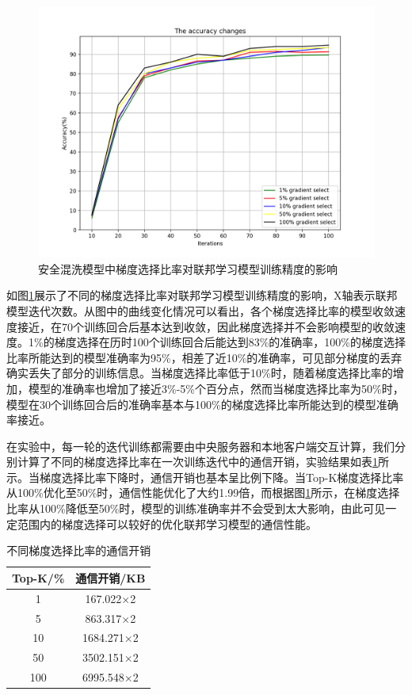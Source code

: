 \begin{figure}[!hbt]
\centering
  	\includegraphics[scale=0.5]{fig2/C4/实验一K值}%
	\caption{安全混洗模型中梯度选择比率对联邦学习模型训练精度的影响}
  	\label{fig:安全混洗模型中梯度选择比率对联邦学习模型训练精度的影响} 
\end{figure}

如图\ref{fig:安全混洗模型中梯度选择比率对联邦学习模型训练精度的影响}展示了不同的梯度选择比率对联邦学习模型训练精度的影响，X轴表示联邦模型迭代次数。从图中的曲线变化情况可以看出，各个梯度选择比率的模型收敛速度接近，在70个训练回合后基本达到收敛，因此梯度选择并不会影响模型的收敛速度。1\%的梯度选择在历时100个训练回合后能达到83\%的准确率，100\%的梯度选择比率所能达到的模型准确率为95\%，相差了近10\%的准确率，可见部分梯度的丢弃确实丢失了部分的训练信息。当梯度选择比率低于10\%时，随着梯度选择比率的增加，模型的准确率也增加了接近3\%-5\%个百分点，然而当梯度选择比率为50\%时，模型在30个训练回合后的准确率基本与100\%的梯度选择比率所能达到的模型准确率接近。

在实验中，每一轮的迭代训练都需要由中央服务器和本地客户端交互计算，我们分别计算了不同的梯度选择比率在一次训练迭代中的通信开销，实验结果如表\ref{不同梯度选择比率的通信开销}所示。当梯度选择比率下降时，通信开销也基本呈比例下降。当Top-K梯度选择比率从100\%优化至50\%时，通信性能优化了大约1.99倍，而根据图\ref{fig:安全混洗模型中梯度选择比率对联邦学习模型训练精度的影响}所示，在梯度选择比率从100\%降低至50\%时，模型的训练准确率并不会受到太大影响，由此可见一定范围内的梯度选择可以较好的优化联邦学习模型的通信性能。

\begin{table}[H]
	\centering
	\begin{tabular}{cc}
		\hline
		Top-K/\%& 通信开销/KB\\
		\hline
		1& 167.022×2\\
		5& 863.317×2\\
		10& 1684.271×2\\
		50& 3502.151×2\\
		100& 6995.548×2\\
		\hline
	\end{tabular}
	\caption{不同梯度选择比率的通信开销}
	\label{不同梯度选择比率的通信开销}
\end{table}

